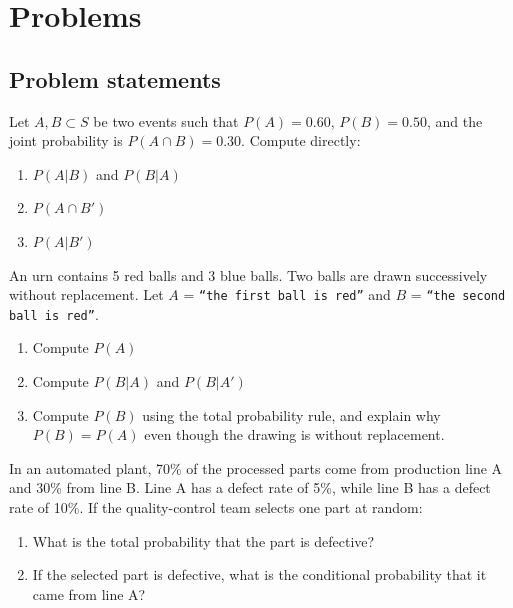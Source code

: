 \section*{Problems}

\subsection*{Problem statements}

\begin{problema}
	\label{prob:8794f31}
	Let $A, B \subset S$ be two events such that $P(A) = 0.60$, $P(B) = 0.50$, and the joint probability is $P(A \cap B) = 0.30$. Compute directly:
	\begin{enumerate}
		\item $P(A|B)$ and $P(B|A)$
		\item $P(A \cap B')$
		\item $P(A|B')$
	\end{enumerate}
\end{problema}

\begin{problema}
	\label{prob:cf929e4}
	An urn contains 5 red balls and 3 blue balls. Two balls are drawn successively without replacement. Let $A$ = \texttt{``the first ball is red''} and $B$ = \texttt{``the second ball is red''}.
	\begin{enumerate}
		\item Compute $P(A)$
		\item Compute $P(B|A)$ and $P(B|A')$
		\item Compute $P(B)$ using the total probability rule, and explain why $P(B)=P(A)$ even though the drawing is without replacement.
	\end{enumerate}
\end{problema}

\begin{problema}
	\label{prob:52e63a3}
	In an automated plant, 70\% of the processed parts come from production line A and 30\% from line B. Line A has a defect rate of 5\%, while line B has a defect rate of 10\%. If the quality-control team selects one part at random:
	\begin{enumerate}
		\item What is the total probability that the part is defective?
		\item If the selected part is defective, what is the conditional probability that it came from line A?
	\end{enumerate}
\end{problema}

